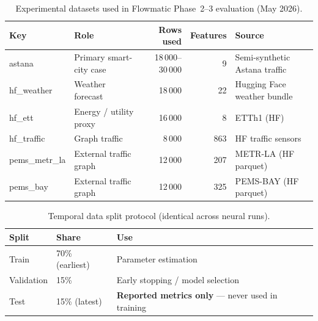 
\begin{table}[H]
  \centering
  \caption{Experimental datasets used in Flowmatic Phase~2--3 evaluation (May 2026).}
  \label{tab:phase4_datasets}
  \small
  \begin{tabular}{@{}llrrl@{}}
    \toprule
    \textbf{Key} & \textbf{Role} & \textbf{Rows used} & \textbf{Features} & \textbf{Source} \\
    \midrule
    astana & Primary smart-city case & 18\,000--30\,000 & 9 & Semi-synthetic Astana traffic \\
    hf\_weather & Weather forecast & 18\,000 & 22 & Hugging Face weather bundle \\
    hf\_ett & Energy / utility proxy & 16\,000 & 8 & ETTh1 (HF) \\
    hf\_traffic & Graph traffic & 8\,000 & 863 & HF traffic sensors \\
    pems\_metr\_la & External traffic graph & 12\,000 & 207 & METR-LA (HF parquet) \\
    pems\_bay & External traffic graph & 12\,000 & 325 & PEMS-BAY (HF parquet) \\
    \bottomrule
  \end{tabular}
\end{table}

\begin{table}[H]
  \centering
  \caption{Temporal data split protocol (identical across neural runs).}
  \label{tab:split_protocol}
  \begin{tabular}{@{}lll@{}}
    \toprule
    \textbf{Split} & \textbf{Share} & \textbf{Use} \\
    \midrule
    Train & 70\% (earliest) & Parameter estimation \\
    Validation & 15\% & Early stopping / model selection \\
    Test & 15\% (latest) & \textbf{Reported metrics only} --- never used in training \\
    \bottomrule
  \end{tabular}
\end{table}

